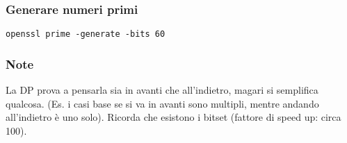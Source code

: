 \subsubsection{Generare numeri primi}
\verb|openssl prime -generate -bits 60|

\subsubsection{Note} La DP prova a pensarla sia in avanti che all’indietro, magari si semplifica qualcosa. (Es. i casi base se si va in avanti sono multipli, mentre
andando all’indietro è uno solo). Ricorda che esistono i bitset (fattore di speed up: circa 100).

